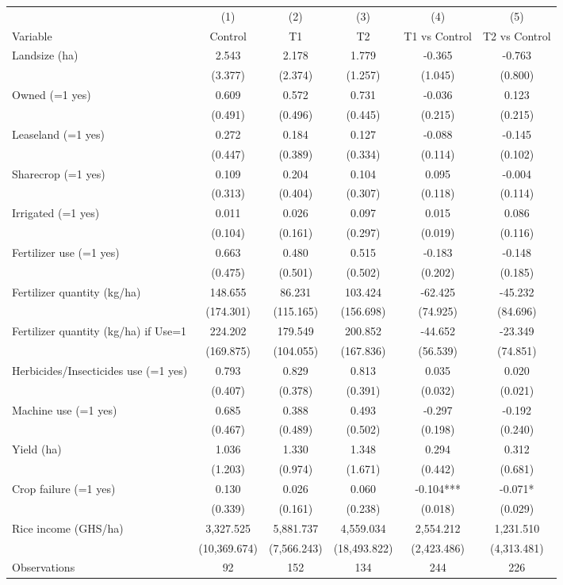 \begin{tabular}{l*{5}c}
\hline\hline
 & (1) & (2) & (3) & (4) & (5) \\
Variable & Control & T1 & T2 & T1 vs Control & T2 vs Control \\
\hline
Landsize (ha)&2.543&2.178&1.779&-0.365&-0.763\\
&(3.377)&(2.374)&(1.257)&(1.045)&(0.800)\\
Owned (=1 yes)&0.609&0.572&0.731&-0.036&0.123\\
&(0.491)&(0.496)&(0.445)&(0.215)&(0.215)\\
Leaseland (=1 yes)&0.272&0.184&0.127&-0.088&-0.145\\
&(0.447)&(0.389)&(0.334)&(0.114)&(0.102)\\
Sharecrop (=1 yes)&0.109&0.204&0.104&0.095&-0.004\\
&(0.313)&(0.404)&(0.307)&(0.118)&(0.114)\\
Irrigated (=1 yes)&0.011&0.026&0.097&0.015&0.086\\
&(0.104)&(0.161)&(0.297)&(0.019)&(0.116)\\
Fertilizer use (=1 yes)&0.663&0.480&0.515&-0.183&-0.148\\
&(0.475)&(0.501)&(0.502)&(0.202)&(0.185)\\
Fertilizer quantity (kg/ha)&148.655&86.231&103.424&-62.425&-45.232\\
&(174.301)&(115.165)&(156.698)&(74.925)&(84.696)\\
Fertilizer quantity (kg/ha) if Use=1&224.202&179.549&200.852&-44.652&-23.349\\
&(169.875)&(104.055)&(167.836)&(56.539)&(74.851)\\
Herbicides/Insecticides use (=1 yes)&0.793&0.829&0.813&0.035&0.020\\
&(0.407)&(0.378)&(0.391)&(0.032)&(0.021)\\
Machine use (=1 yes)&0.685&0.388&0.493&-0.297&-0.192\\
&(0.467)&(0.489)&(0.502)&(0.198)&(0.240)\\
Yield (ha)&1.036&1.330&1.348&0.294&0.312\\
&(1.203)&(0.974)&(1.671)&(0.442)&(0.681)\\
Crop failure (=1 yes)&0.130&0.026&0.060&-0.104***&-0.071*\\
&(0.339)&(0.161)&(0.238)&(0.018)&(0.029)\\
Rice income (GHS/ha)&3,327.525&5,881.737&4,559.034&2,554.212&1,231.510\\
&(10,369.674)&(7,566.243)&(18,493.822)&(2,423.486)&(4,313.481)\\
\hline
Observations & 92 & 152 & 134 & 244 & 226 \\
\hline\hline
\end{tabular}
